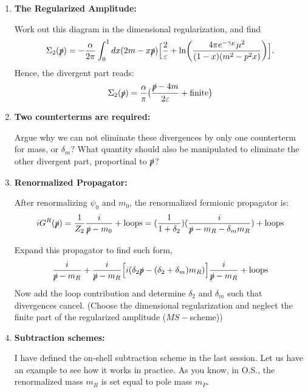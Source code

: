 \documentclass[11pt]{article}
\begin{document}
\begin{enumerate}
	\item
	\begin{problem}{\points{-}}
		\textbf{The Regularized Amplitude:} 
		
		Work out this diagram in the dimensional regularization, and find
		\[
		\Sigma_2(\slashed{p}) = -\frac{\alpha}{2\pi} \int_0^1 dx (2m-x\slashed{p}) \Big[
		\frac{2}{\varepsilon} + \ln(\frac{4\pi e^{-\gamma_E}\mu^2}{(1-x)(m^2-p^2x)})
		\Big].
		\]
		Hence, the divergent part reads:
		\[
		\Sigma_2(\slashed{p}) = \frac{\alpha}{\pi} \big(
		\frac{\slashed{p} - 4m}{2\varepsilon} + \text{finite}
		\big) 	
	\]
	\end{problem}

	\item
	\begin{problem}{\points{-}}
		\textbf{Two counterterms are required:} 
		
		Argue why we can not eliminate these divergences by only one counterterm for mass, or $\delta_m$?
		What quantity should also be manipulated to eliminate the other divergent part, proportinal to $\slashed{p}$?
	\end{problem}


\item
\begin{problem}{\points{-}}
	\textbf{Renormalized Propagator:} 
	 
	 After renormalizing $\psi_0$  and $m_0$, the renormalized fermionic propagator is:
	 \[
	 iG^R(\slashed{p}) = \frac{1}{Z_2}\frac{i}{\slashed{p}-m_0}+ \text{loops} = (\frac{1}{1+\delta_2})
	 (\frac{i}{\slashed{p} -m_R -\delta_m m_R})+ \text{loops}
	 \]
	
	Expand this propagator to find such form,
	\[
	\frac{i}{\slashed{p}-m_R} + \frac{i}{\slashed{p}-m_R}\Big[
	i(\delta_2\slashed{p} - (\delta_2+\delta_m) m_R)
	\Big]\frac{i}{\slashed{p}-m_R} + \text{loops}
	\]
	Now add the loop contribution and determine $\delta_2$ and $\delta_m$ such that divergences cancel. (Choose the dimensional regularization and neglect the finite part of the regularized amplitude ($MS-$scheme))
\end{problem}


\item
\begin{problem}{\points{-}}
	\textbf{Subtraction schemes:} 
	
	I have defined the on-shell subtraction scheme in the last session. Let us have an example to see how it works in practice. As you know, in O.S., the renormalized mass $m_R$ is set equal to pole mass $m_P$.
	

\end{problem}
\end{enumerate}
\end{document}
